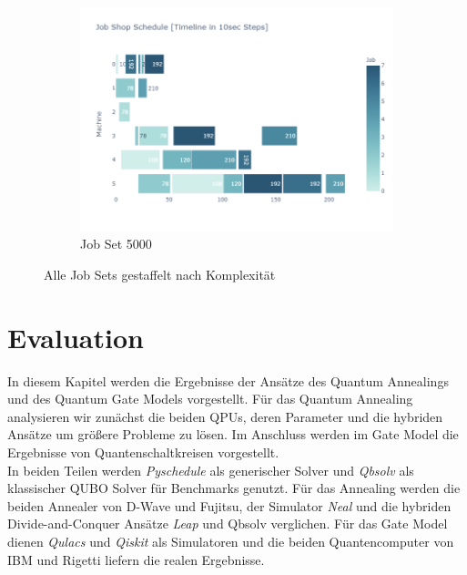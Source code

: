 \begin{figure}[H]
        \hfill
        \begin{subfigure}[b]{0.445\textwidth}
            \centering 
            \includegraphics[trim={0 0 2.6cm 0}, clip,width=\textwidth]{images/Job5000}
            \caption[]%
            {{\small Job Set 5000}}    
            \label{fig:JobSet5000}
        \end{subfigure}
        \caption[ Alle Job Sets gestaffelt nach Komplexität ]
         {\small Alle Job Sets gestaffelt nach Komplexität} 
        \label{fig:JobSets}
    \end{figure}

\section{Evaluation}
\label{sec:evaluation}
In diesem Kapitel werden die Ergebnisse der Ansätze des Quantum Annealings und des Quantum Gate Models vorgestellt. Für das Quantum Annealing analysieren wir zunächst die beiden QPUs, deren Parameter und die hybriden Ansätze um größere Probleme zu lösen.
Im Anschluss werden im Gate Model die Ergebnisse von Quantenschaltkreisen vorgestellt.\\
In beiden Teilen werden \textit{Pyschedule} als generischer Solver und \textit{Qbsolv} als klassischer QUBO Solver für Benchmarks genutzt. Für das Annealing werden die beiden Annealer von D-Wave und Fujitsu, der Simulator \textit{Neal} und die hybriden Divide-and-Conquer Ansätze \textit{Leap} und Qbsolv verglichen. Für das Gate Model dienen \textit{Qulacs} und \textit{Qiskit} als Simulatoren und die beiden Quantencomputer von IBM und Rigetti liefern die realen Ergebnisse.  

